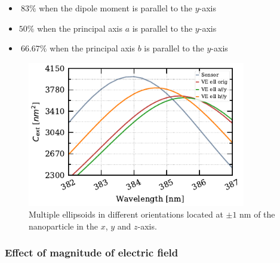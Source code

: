 \begin{itemize}
    \item {$~83\%$ when the dipole moment is parallel to the $y$-axis}
    \item {$50\%$ when the principal axis $a$ is parallel to the $y$-axis}
    \item {$~66.67\%$ when the principal axis $b$ is parallel to the $y$-axis}
\end{itemize}    
 

\begin{figure} %
    \centering
    \includegraphics[width=0.85\textwidth]{six_ve_ell_mult_config.pdf} 
    \caption{Multiple ellipsoids in different orientations located at $\pm 1$ nm of the nanoparticle
            in the $x$, $y$ and $z$-axis.}
    \label{fig:mult_ell}
 \end{figure}

\subsubsection{Effect of magnitude of electric field}

